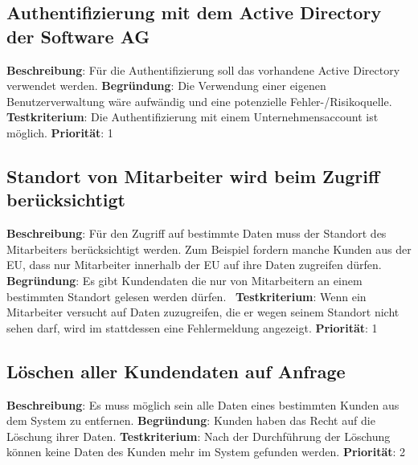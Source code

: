 \subsection{Authentifizierung mit dem Active Directory der Software AG} \label{sec:anforderungsspezifikation:SAG_AD}
\textbf{Beschreibung}: Für die Authentifizierung soll das vorhandene Active Directory verwendet werden.
\newline \textbf{Begründung}: Die Verwendung einer eigenen Benutzerverwaltung wäre aufwändig und eine potenzielle Fehler-/Risikoquelle.
\newline \textbf{Testkriterium}: Die Authentifizierung mit einem Unternehmensaccount ist möglich.
\newline \textbf{Priorität}: 1

\subsection{Standort von Mitarbeiter wird beim Zugriff berücksichtigt} \label{sec:anforderungsspezifikation:zugriffStandort}
\textbf{Beschreibung}: Für den Zugriff auf bestimmte Daten muss der Standort des Mitarbeiters berücksichtigt werden. Zum Beispiel fordern manche Kunden aus der EU, dass nur Mitarbeiter innerhalb der EU auf ihre Daten zugreifen dürfen.
\newline \textbf{Begründung}: Es gibt Kundendaten die nur von Mitarbeitern an einem bestimmten Standort gelesen werden dürfen. 
\newline \textbf{Testkriterium}: Wenn ein Mitarbeiter versucht auf Daten zuzugreifen, die er wegen seinem Standort nicht sehen darf, wird im stattdessen eine Fehlermeldung angezeigt.
\newline \textbf{Priorität}: 1

\subsection{Löschen aller Kundendaten auf Anfrage} \label{sec:anforderungsspezifikation:löschenKundendaten}
\textbf{Beschreibung}: Es muss möglich sein alle Daten eines bestimmten Kunden aus dem System zu entfernen.
\newline \textbf{Begründung}: Kunden haben das Recht auf die Löschung ihrer Daten.
\newline \textbf{Testkriterium}: Nach der Durchführung der Löschung können keine Daten des Kunden mehr im System gefunden werden.
\newline \textbf{Priorität}: 2

